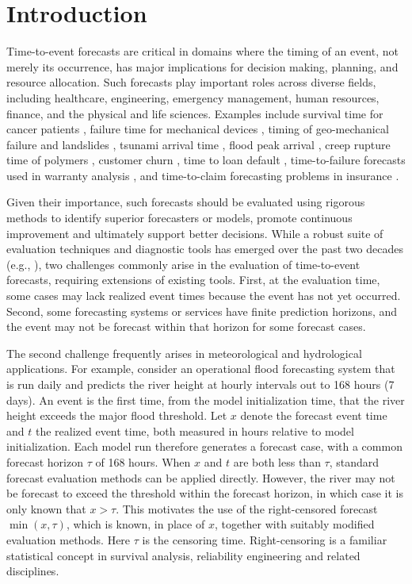 \documentclass[10pt]{article} %
\theoremstyle{theorem}
\theoremstyle{definition}
\begin{document}
\section{Introduction}


Time-to-event forecasts are critical in domains where the timing of an event, not merely its occurrence, has major implications for decision making, planning, and resource allocation. Such forecasts play important roles across diverse fields, including healthcare, engineering, emergency management, human resources, finance, and the physical and life sciences. Examples include survival time for cancer patients \citep{llobera2000terminal}, failure time for mechanical devices \citep{wang2015failure}, timing of geo-mechanical failure and landslides \citep{mufundirwa2010new}, tsunami arrival time \citep{greenslade2019evaluation}, flood peak arrival \citep{langridge2021dynamic}, creep rupture time of polymers \citep{spathis2012creep}, customer churn \citep{huang2012customer}, time to loan default \citep{sarlija2009comparison}, time-to-failure forecasts used in warranty analysis \citep{babakmehr2024data}, and time-to-claim forecasting problems in insurance \citep{berestizhevsky2021cox}.

Given their importance, such forecasts should be evaluated using rigorous methods to identify superior forecasters or models, promote continuous improvement and ultimately support better decisions. While a robust suite of evaluation techniques and diagnostic tools has emerged over the past two decades (e.g., \citealp{gneiting2007strictly, gneiting2011making, ehm2016quantiles, dimitriadis2024evaluating}), two challenges commonly arise in the evaluation of time-to-event forecasts, requiring extensions of existing tools. First, at the evaluation time, some cases may lack realized event times because the event has not yet occurred. Second, some forecasting systems or services have finite prediction horizons, and the event may not be forecast within that horizon for some forecast cases.

The second challenge frequently arises in meteorological and hydrological applications. For example, consider an operational flood forecasting system that is run daily and predicts the river height at hourly intervals out to 168 hours (7 days). An event is the first time, from the model initialization time, that the river height exceeds the major flood threshold. Let $x$ denote the forecast event time and $t$ the realized event time, both measured in hours relative to model initialization. Each model run therefore generates a forecast case, with a common forecast horizon $\tau$ of 168 hours. When $x$ and $t$ are both less than $\tau$, standard forecast evaluation methods can be applied directly. However, the river may not be forecast to exceed the threshold within the forecast horizon, in which case it is only known that $x > \tau$. This motivates the use of the right-censored forecast $\min(x,\tau)$, which is known, in place of $x$, together with suitably modified evaluation methods. Here $\tau$ is the censoring time. Right-censoring is a familiar statistical concept in survival analysis, reliability engineering and related disciplines.
\end{document}
